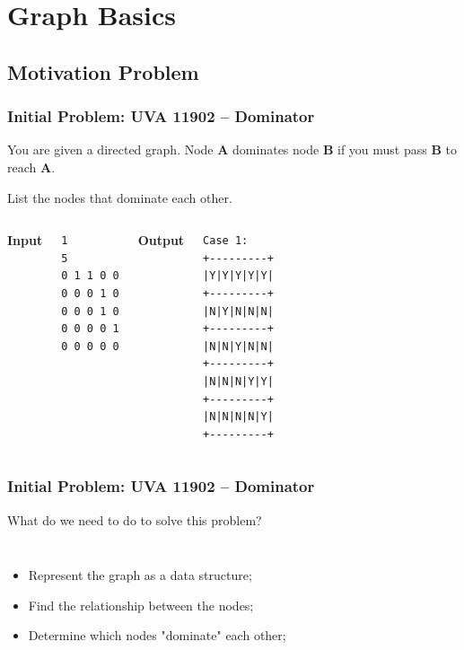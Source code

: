 

\section{Graph Basics}
\subsection{Motivation Problem}

\begin{frame}[fragile]
  \frametitle{Initial Problem: UVA 11902 -- Dominator}
  \begin{block}{}
    You are given a directed graph. Node {\bf A} dominates
    node {\bf B} if you \alert{must} pass {\bf B} to reach {\bf A}.
    \bigskip

    List the nodes that dominate each other.
  \end{block}
  \begin{center}
    \begin{columns}[T]
      
      {\bf Input}
\begin{verbatim}
1
5
0 1 1 0 0
0 0 0 1 0
0 0 0 1 0
0 0 0 0 1
0 0 0 0 0
\end{verbatim}
{\bf Output}
{\small
\begin{verbatim}
Case 1:
+---------+
|Y|Y|Y|Y|Y|
+---------+
|N|Y|N|N|N|
+---------+
|N|N|Y|N|N|
+---------+
|N|N|N|Y|Y|
+---------+
|N|N|N|N|Y|
+---------+
\end{verbatim}}
    \end{columns}
  \end{center}
\end{frame}


\begin{frame}
  \frametitle{Initial Problem: UVA 11902 -- Dominator}
  \begin{block}{}
    What do we need to do to solve this problem?
  \end{block}

  \begin{center}
    \begin{columns}[T]
      
      \begin{itemize}
        \item Represent the graph as a data structure;\bigskip
        \item Find the relationship between the nodes;\bigskip
        \item Determine which nodes "dominate" each other;\bigskip
      \end{itemize}
    \end{columns}
  \end{center}
\end{frame}

